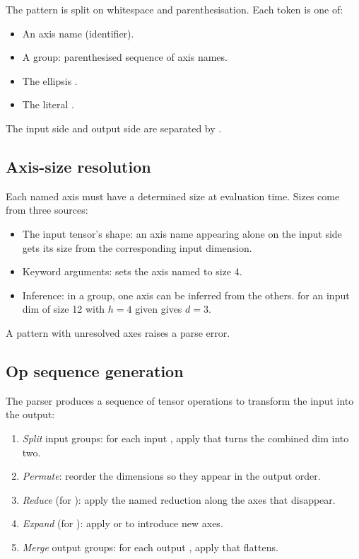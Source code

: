The pattern is split on whitespace and parenthesisation. Each
token is one of:

\begin{itemize}
  \item An axis name (identifier).
  \item A group: parenthesised sequence of axis names.
  \item The ellipsis .
  \item The literal .
\end{itemize}

The input side and output side are separated by \code{->}.

\subsection{Axis-size resolution}
\label{ssec:einops:size_resolution}

Each named axis must have a determined size at evaluation time.
Sizes come from three sources:

\begin{itemize}
  \item The input tensor's shape: an axis name appearing alone
    on the input side gets its size from the corresponding input
    dimension.
  \item Keyword arguments:  sets
    the axis named  to size 4.
  \item Inference: in a group, one axis can be inferred from the
    others.  for an input dim of size 12 with $h = 4$
    given gives $d = 3$.
\end{itemize}

A pattern with unresolved axes raises a parse error.

\subsection{Op sequence generation}
\label{ssec:einops:op_sequence}

The parser produces a sequence of tensor operations to transform
the input into the output:

\begin{enumerate}
  \item \emph{Split} input groups: for each input ,
    apply  that turns the combined dim into two.
  \item \emph{Permute}: reorder the dimensions so they appear in
    the output order.
  \item \emph{Reduce} (for ): apply the named
    reduction along the axes that disappear.
  \item \emph{Expand} (for ): apply  or
     to introduce new axes.
  \item \emph{Merge} output groups: for each output ,
    apply  that flattens.
\end{enumerate}

